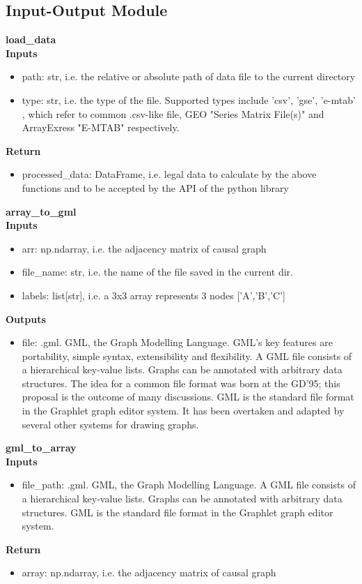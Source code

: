 \subsection{Input\mbox{-}Output Module}
\textbf{load\_data}\\

\textbf{Inputs}
\begin{itemize}
    \item path: str, i.e. the relative or absolute path of data file to the current directory
    \item type: str, i.e. the type of the file. Supported types include 'csv', 'gse', 'e\mbox{-}mtab' , which refer to common .csv-like file, GEO "Series Matrix File(s)" and ArrayExress  "E\mbox{-}MTAB"  respectively.
\end{itemize}
\par\textbf{Return}
\begin{itemize}
    \item processed\_data: DataFrame, i.e. legal data to calculate by the above functions and to be accepted by the API of the python library 
\end{itemize}

\noindent \textbf{array\_to\_gml}\\

\textbf{Inputs}
\begin{itemize}
    \item arr: np.ndarray, i.e. the adjacency matrix of causal graph
    \item file\_name: str, i.e. the name of the file saved in the current dir.
    \item labels: list[str], i.e. a 3x3 array represents 3 nodes ['A','B','C']
\end{itemize}
\par\textbf{Outputs}
\begin{itemize}
    \item file: .gml. GML, the Graph Modelling Language. GML’s key features are portability, simple syntax, extensibility and flexibility. A GML file consists of a hierarchical key-value lists. Graphs can be annotated with arbitrary data structures. The idea for a common file format was born at the GD’95; this proposal is the outcome of many discussions. GML is the standard file format in the Graphlet graph editor system. It has been overtaken and adapted by several other systems for drawing graphs.
\end{itemize}

\noindent \textbf{gml\_to\_array}\\

\textbf{Inputs}
\begin{itemize}
    \item  file\_path: .gml. GML, the Graph Modelling Language. A GML file consists of a hierarchical key-value lists. Graphs can be annotated with arbitrary data structures. GML is the standard file format in the Graphlet graph editor system. 
\end{itemize}
\par\textbf{Return}
\begin{itemize}
    \item array: np.ndarray, i.e. the adjacency matrix of causal graph
\end{itemize}